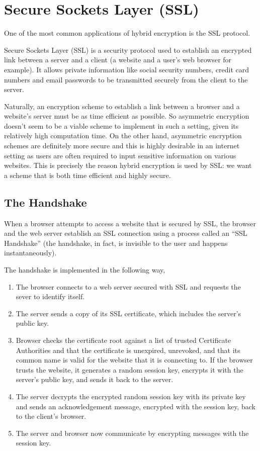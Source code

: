 \section{Secure Sockets Layer (SSL)}

One of the most common applications of hybrid encryption is the SSL protocol.

Secure Sockets Layer (SSL) is a security protocol used to establish an encrypted link between a server and a client (a website and a user's web browser for example). It allows private information like social security numbers, credit card numbers and email passwords to be transmitted securely from the client to the server.

Naturally, an encryption scheme to establish a link between a browser and a website's server must be as time efficient as possible. So asymmetric encryption doesn't seem to be a viable scheme to implement in such a setting, given its relatively high computation time. On the other hand, asymmetric encryption schemes are definitely more secure and this is highly desirable in an internet setting as users are often required to input sensitive information on various websites. This is precisely the reason hybrid encryption is used by SSL: we want a scheme that is both time efficient and highly secure.

\subsection{The Handshake}


\cite{digicert}When a browser attempts to access a website that is secured by SSL, the browser and the web server establish an SSL connection using a process called an “SSL Handshake” (the handshake, in fact, is invisible to the user and happens instantaneously).

The handshake is implemented in the following way,
\begin{enumerate}
\item The browser connects to a web server secured with SSL and requests the sever to identify itself.
\item The server sends a copy of its SSL certificate, which includes the server's public key.
\item Browser checks the certificate root against a list of trusted Certificate Authorities and that the certificate is unexpired, unrevoked, and that its common name is valid for the website that it is connecting to. If the browser trusts the website, it generates a random session key, encrypts it with the server's public key, and sends it back to the server.
\item The server decrypts the encrypted random session key with its private key and sends an acknowledgement message, encrypted with the session key, back to the client's browser.
\item The server and browser now communicate by encrypting messages with the session key.
\end{enumerate}


